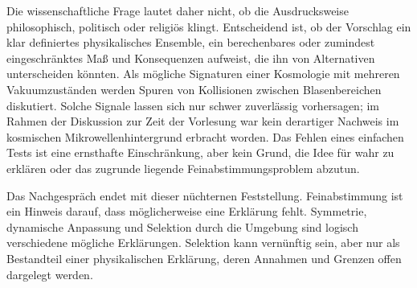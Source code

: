 Die wissenschaftliche Frage lautet daher nicht, ob die Ausdrucksweise philosophisch, politisch oder religiös klingt. Entscheidend ist, ob der Vorschlag ein klar definiertes physikalisches Ensemble, ein berechenbares oder zumindest eingeschränktes Maß und Konsequenzen aufweist, die ihn von Alternativen unterscheiden könnten. Als mögliche Signaturen einer Kosmologie mit mehreren Vakuumzuständen werden Spuren von Kollisionen zwischen Blasenbereichen diskutiert. Solche Signale lassen sich nur schwer zuverlässig vorhersagen; im Rahmen der Diskussion zur Zeit der Vorlesung war kein derartiger Nachweis im kosmischen Mikrowellenhintergrund erbracht worden. Das Fehlen eines einfachen Tests ist eine ernsthafte Einschränkung, aber kein Grund, die Idee für wahr zu erklären oder das zugrunde liegende Feinabstimmungsproblem abzutun.

\begin{classroomqa}
\end{classroomqa}

Das Nachgespräch endet mit dieser nüchternen Feststellung. Feinabstimmung ist ein Hinweis darauf, dass möglicherweise eine Erklärung fehlt. Symmetrie, dynamische Anpassung und Selektion durch die Umgebung sind logisch verschiedene mögliche Erklärungen. Selektion kann vernünftig sein, aber nur als Bestandteil einer physikalischen Erklärung, deren Annahmen und Grenzen offen dargelegt werden.
